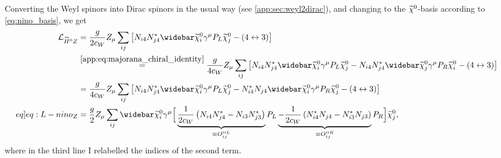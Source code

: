 \documentclass[english, notitlepage]{article}
\begin{document}
            Converting the Weyl spinors into Dirac spinors in the usual way (see \cref{app:sec:weyl2dirac}), and changing to the \(\widetilde{\chi}^0_{}\)-basis according to \cref{eq:nino_basis}, we get
            \begin{align}
                \nonumber
                \L_{\wtilde{H}^0Z} & = \frac{g}{2c_W} Z_\mu \sum_{ij} \bclosed{N_{i4}N_{j4}^\ast \barnino[i]\gamma^\mu P_L \nino[j] - (4 \leftrightarrow 3)}                                                                                                                                                                                     \\
                \nonumber
                                   & \stackrel{\mathrm{\cref{app:eq:majorana_chiral_identity}}}{=} \frac{g}{4c_W} Z_\mu \sum_{ij} \bclosed{N_{i4}N_{j4}^\ast \barnino[i]\gamma^\mu P_L \nino[j] - N_{i4}N_{j4}^\ast \barnino[j]\gamma^\mu P_R \nino[i] - (4 \leftrightarrow 3)}                                                                  \\
                \nonumber
                                   & = \frac{g}{4c_W} Z_\mu \sum_{ij} \bclosed{N_{i4}N_{j4}^\ast \barnino[i]\gamma^\mu P_L \nino[j] - N_{i4}^\ast N_{j4} \barnino[i]\gamma^\mu P_R \nino[j] - (4 \leftrightarrow 3)}                                                                                                                             \\
                \label[eq]{eq:L-nino_Z}
                                   & = \frac{g}{2} Z_\mu \sum_{ij} \barnino[i] \gamma^\mu \Big[ \underbrace{\frac{1}{2c_W}\pclosed{N_{i4}N_{j4}^\ast - N_{i3}N_{j3}^\ast}}_{\equiv O^{\prime\prime L}_{ij}}P_L \underbrace{-\frac{1}{2c_W}\pclosed{N_{i4}^\ast N_{j4} - N_{i3}^\ast N_{j3}}}_{\equiv O^{\prime\prime R}_{ij}}P_R \Big] \nino[j],
            \end{align}
            where in the third line I relabelled the indices of the second term.

\end{document}

